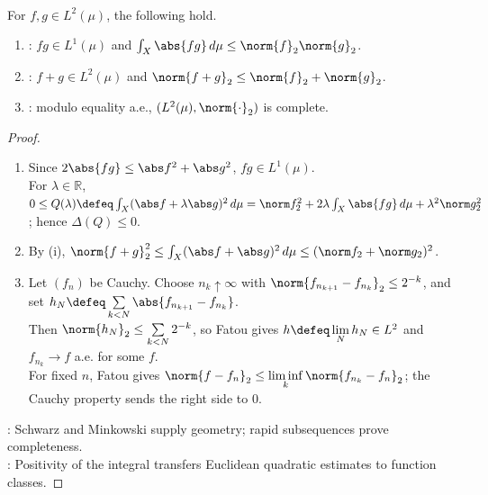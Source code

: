 \begin{theorem} \label{thm:l2-schwarz-minkowski-and-completeness} \\
For $f,g\in L^2(\mu)$, the following hold.
\begin{enumerate}[label=(\roman*)]
\setlength{\itemsep}{0pt}
\item {}: $fg\in L^1(\mu)$ and $\int_X\abs{fg}\,d\mu\leq\norm{f}_2\norm{g}_2$.
\item {}: $f+g\in L^2(\mu)$ and $\norm{f+g}_2\leq\norm{f}_2+\norm{g}_2$.
\item {}: modulo equality a.e., $(L^2(\mu),\norm{\cdot}_2)$ is complete.
\end{enumerate}
\begin{proof}
\begin{enumerate}[label=(\roman*)]
\setlength{\itemsep}{0pt}
\item Since $2\abs{fg}\leq\abs f^2+\abs g^2$, $fg\in L^1(\mu)$.\\
For $\lambda\in\mathbb R$, $0\leq Q(\lambda)\defeq\int_X(\abs f+\lambda\abs g)^2\,d\mu=\norm f_2^2+2\lambda\int_X\abs{fg}\,d\mu+\lambda^2\norm g_2^2$; hence $\Delta(Q)\leq0$.
\item By (i), $\norm{f+g}_2^2\leq\int_X(\abs f+\abs g)^2\,d\mu\leq(\norm f_2+\norm g_2)^2$.
\item Let $(f_n)$ be Cauchy. Choose $n_k\uparrow\infty$ with $\norm{f_{n_{k+1}}-f_{n_k}}_2\leq2^{-k}$, and set $h_N\defeq\sum\limits_{k<N}\abs{f_{n_{k+1}}-f_{n_k}}$.\\
Then $\norm{h_N}_2\leq\sum\limits_{k<N}2^{-k}$, so Fatou gives $h\defeq\lim\limits_Nh_N\in L^2$ and $f_{n_k}\to f$ a.e. for some $f$.\\
For fixed $n$, Fatou gives $\norm{f-f_n}_2\leq\liminf\limits_k\norm{f_{n_k}-f_n}_2$; the Cauchy property sends the right side to $0$.
\end{enumerate}
: Schwarz and Minkowski supply geometry; rapid subsequences prove completeness.\\
: Positivity of the integral transfers Euclidean quadratic estimates to function classes.
\end{proof}
\end{theorem}


